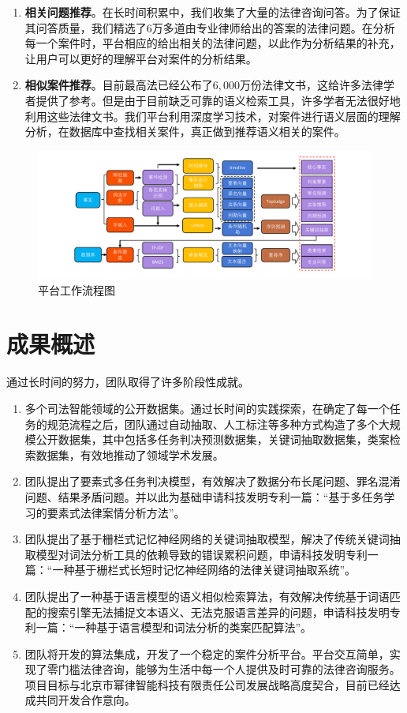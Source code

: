 \begin{enumerate}[1)]
	\item \textbf{相关问题推荐}。在长时间积累中，我们收集了大量的法律咨询问答。为了保证其问答质量，我们精选了$6$万多道由专业律师给出的答案的法律问题。在分析每一个案件时，平台相应的给出相关的法律问题，以此作为分析结果的补充，让用户可以更好的理解平台对案件的分析结果。
	\item \textbf{相似案件推荐}。目前最高法已经公布了$6,000$万份法律文书，这给许多法律学者提供了参考。但是由于目前缺乏可靠的语义检索工具，许多学者无法很好地利用这些法律文书。我们平台利用深度学习技术，对案件进行语义层面的理解分析，在数据库中查找相关案件，真正做到推荐语义相关的案件。
	\end{enumerate}

\begin{figure}
	\centering
    \includegraphics[width=\linewidth]{figures/flowsheet}
    \caption{平台工作流程图}
    \label{fig:flowsheet}
\end{figure}


\section{成果概述}

通过长时间的努力，团队取得了许多阶段性成就。

\begin{enumerate}[1)]
	\item 多个司法智能领域的公开数据集。通过长时间的实践探索，在确定了每一个任务的规范流程之后，团队通过自动抽取、人工标注等多种方式构造了多个大规模公开数据集，其中包括多任务判决预测数据集，关键词抽取数据集，类案检索数据集，有效地推动了领域学术发展。
	\item 团队提出了要素式多任务判决模型，有效解决了数据分布长尾问题、罪名混淆问题、结果矛盾问题。并以此为基础申请科技发明专利一篇：“基于多任务学习的要素式法律案情分析方法”。
	\item 团队提出了基于栅栏式记忆神经网络的关键词抽取模型，解决了传统关键词抽取模型对词法分析工具的依赖导致的错误累积问题，申请科技发明专利一篇：“一种基于栅栏式长短时记忆神经网络的法律关键词抽取系统”。
	\item 团队提出了一种基于语言模型的语义相似检索算法，有效解决传统基于词语匹配的搜索引擎无法捕捉文本语义、无法克服语言差异的问题，申请科技发明专利一篇：“一种基于语言模型和词法分析的类案匹配算法”。
	\item 团队将开发的算法集成，开发了一个稳定的案件分析平台。平台交互简单，实现了零门槛法律咨询，能够为生活中每一个人提供及时可靠的法律咨询服务。项目目标与北京市幂律智能科技有限责任公司发展战略高度契合，目前已经达成共同开发合作意向。
\end{enumerate}

